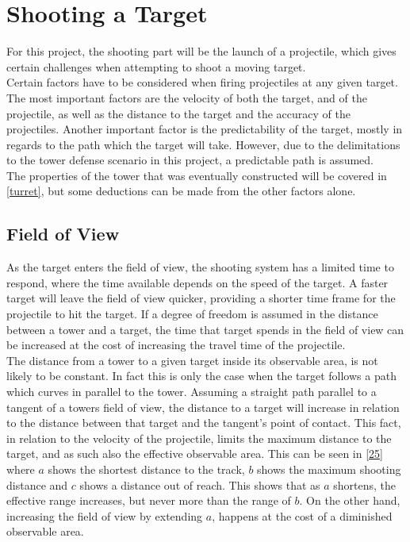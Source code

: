 \section{Shooting a Target}\label{sec:shooting}
For this project, the shooting part will be the launch of a projectile, which gives certain challenges when attempting to shoot a moving target. \\

Certain factors have to be considered when firing projectiles at any given target. The most important factors are the velocity of both the target, and of the projectile, as well as the distance to the target and the accuracy of the projectiles. Another important factor is the predictability of the target, mostly in regards to the path which the target will take. However, due to the delimitations to the tower defense scenario in this project, a predictable path is assumed. \\

The properties of the tower that was eventually constructed will be covered in \cref{turret}, but some deductions can be made from the other factors alone.

\subsection{Field of View}\label{FoW}
As the target enters the field of view, the shooting system has a limited time to respond, where the time available depends on the speed of the target. A faster target will leave the field of view quicker, providing a shorter time frame for the projectile to hit the target. If a degree of freedom is assumed in the distance between a tower and a target, the time that target spends in the field of view can be increased at the cost of increasing the travel time of the projectile.\\

The distance from a tower to a given target inside its observable area, is not likely to be constant. In fact this is only the case when the target follows a path which curves in parallel to the tower. Assuming a straight path parallel to a tangent of a towers field of view, the distance to a target will increase in relation to the distance between that target and the tangent's point of contact. This fact, in relation to the velocity of the projectile, limits the maximum distance to the target, and as such also the effective observable area. This can be seen in \cref{25} where $a$ shows the shortest distance to the track, $b$ shows the maximum shooting distance and $c$ shows a distance out of reach. This shows that as $a$ shortens, the effective range increases, but never more than the range of $b$. On the other hand, increasing the field of view by extending $a$, happens at the cost of a diminished observable area.

